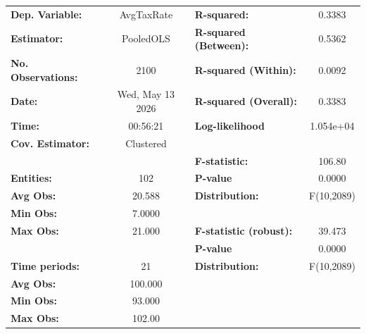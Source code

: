 \begin{center}
\begin{tabular}{lclc}
\toprule
\textbf{Dep. Variable:}                       &     AvgTaxRate     & \textbf{  R-squared:         }   &      0.3383      \\
\textbf{Estimator:}                           &     PooledOLS      & \textbf{  R-squared (Between):}  &      0.5362      \\
\textbf{No. Observations:}                    &        2100        & \textbf{  R-squared (Within):}   &      0.0092      \\
\textbf{Date:}                                &  Wed, May 13 2026  & \textbf{  R-squared (Overall):}  &      0.3383      \\
\textbf{Time:}                                &      00:56:21      & \textbf{  Log-likelihood     }   &    1.054e+04     \\
\textbf{Cov. Estimator:}                      &     Clustered      & \textbf{                     }   &                  \\
\textbf{}                                     &                    & \textbf{  F-statistic:       }   &      106.80      \\
\textbf{Entities:}                            &        102         & \textbf{  P-value            }   &      0.0000      \\
\textbf{Avg Obs:}                             &       20.588       & \textbf{  Distribution:      }   &    F(10,2089)    \\
\textbf{Min Obs:}                             &       7.0000       & \textbf{                     }   &                  \\
\textbf{Max Obs:}                             &       21.000       & \textbf{  F-statistic (robust):} &      39.473      \\
\textbf{}                                     &                    & \textbf{  P-value            }   &      0.0000      \\
\textbf{Time periods:}                        &         21         & \textbf{  Distribution:      }   &    F(10,2089)    \\
\textbf{Avg Obs:}                             &      100.000       & \textbf{                     }   &                  \\
\textbf{Min Obs:}                             &       93.000       & \textbf{                     }   &                  \\
\textbf{Max Obs:}                             &       102.00       & \textbf{                     }   &                  \\

\end{tabular}
\end{center}
